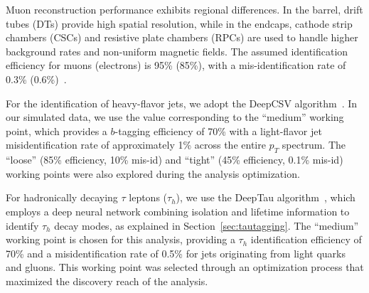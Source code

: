 Muon reconstruction performance exhibits regional differences. In the barrel, drift tubes (DTs) provide high spatial resolution, while in the endcaps, cathode strip chambers (CSCs) and resistive plate chambers (RPCs) are used to handle higher background rates and non-uniform magnetic fields. The assumed identification efficiency for muons (electrons) is 95\% (85\%), with a mis-identification rate of 0.3\% (0.6\%)~\parencite{CMS-PAS-FTR-13-014,CMS_MUON_17001,CMS_EGM_17001}.

For the identification of heavy-flavor jets, we adopt the DeepCSV algorithm~\parencite{CMS_BTV2016}. In our simulated data, we use the value corresponding to the ``medium'' working point, which provides a $b$-tagging efficiency of 70\% with a light-flavor jet misidentification rate of approximately 1\% across the entire $p_T$ spectrum. The ``loose'' (85\% efficiency, 10\% mis-id) and ``tight'' (45\% efficiency, 0.1\% mis-id) working points were also explored during the analysis optimization.

For hadronically decaying $\tau$ leptons ($\tau_h$), we use the DeepTau algorithm~\parencite{CMS_DeepTau}, which employs a deep neural network combining isolation and lifetime information to identify $\tau_h$ decay modes, as explained in Section~\ref{sec:tautagging}. The ``medium'' working point is chosen for this analysis, providing a $\tau_h$ identification efficiency of 70\% and a misidentification rate of 0.5\% for jets originating from light quarks and gluons. This working point was selected through an optimization process that maximized the discovery reach of the analysis.
